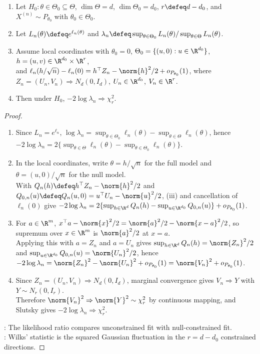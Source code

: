 \begin{theorem} \label{thm:wilks-likelihood-ratio-chi-square} 
\begin{enumerate}[label=(\roman*)]
\setlength{\itemsep}{0pt}
\item Let $H_0:\theta\in\Theta_0\subseteq\Theta$, $\dim\Theta=d$, $\dim\Theta_0=d_0$, $r\defeq d-d_0$, and $X^{(n)}\sim P_{\theta_0}$ with $\theta_0\in\Theta_0$.
\item Let $L_n(\theta)\defeq e^{\ell_n(\theta)}$ and $\lambda_n\defeq\sup_{\theta\in\Theta_0}L_n(\theta)/\sup_{\theta\in\Theta}L_n(\theta)$.
\item Assume local coordinates with $\theta_0=0$, $\Theta_0=\{(u,0):u\in\R^{d_0}\}$, $h=(u,v)\in\R^{d_0}\times\R^r$,\\
and $\ell_n(h/\sqrt n)-\ell_n(0)=h^\top Z_n-\norm{h}^2/2+o_{P_{\theta_0}}(1)$, where $Z_n=(U_n,V_n)\Rightarrow N_d(0,I_d)$, $U_n\in\R^{d_0}$, $V_n\in\R^r$.
\item
Then under $H_0$, $-2\log\lambda_n\Rightarrow\chi_r^2$.
\end{enumerate}
\begin{proof}
\begin{enumerate}[label=(\roman*)]
\setlength{\itemsep}{0pt}
\item Since $L_n=e^{\ell_n}$, $\log\lambda_n=\sup_{\theta\in\Theta_0}\ell_n(\theta)-\sup_{\theta\in\Theta}\ell_n(\theta)$, hence $-2\log\lambda_n=2\{\sup_{\theta\in\Theta}\ell_n(\theta)-\sup_{\theta\in\Theta_0}\ell_n(\theta)\}$.
\item In the local coordinates, write $\theta=h/\sqrt n$ for the full model and $\theta=(u,0)/\sqrt n$ for the null model.\\
With $Q_n(h)\defeq h^\top Z_n-\norm{h}^2/2$ and $Q_{0,n}(u)\defeq Q_n(u,0)=u^\top U_n-\norm{u}^2/2$, (iii) and cancellation of $\ell_n(0)$ give $-2\log\lambda_n=2\{\sup_{h\in\R^d}Q_n(h)-\sup_{u\in\R^{d_0}}Q_{0,n}(u)\}+o_{P_{\theta_0}}(1)$.
\item For $a\in\R^m$, $x^\top a-\norm{x}^2/2=\norm{a}^2/2-\norm{x-a}^2/2$, so supremum over $x\in\R^m$ is $\norm{a}^2/2$ at $x=a$.\\
Applying this with $a=Z_n$ and $a=U_n$ gives $\sup_{h\in\R^d}Q_n(h)=\norm{Z_n}^2/2$\\
and $\sup_{u\in\R^{d_0}}Q_{0,n}(u)=\norm{U_n}^2/2$, hence $-2\log\lambda_n=\norm{Z_n}^2-\norm{U_n}^2+o_{P_{\theta_0}}(1)=\norm{V_n}^2+o_{P_{\theta_0}}(1)$.
\item Since $Z_n=(U_n,V_n)\Rightarrow N_d(0,I_d)$, marginal convergence gives $V_n\Rightarrow Y$ with $Y\sim N_r(0,I_r)$.\\
Therefore $\norm{V_n}^2\Rightarrow\norm{Y}^2\sim\chi_r^2$ by continuous mapping, and Slutsky gives $-2\log\lambda_n\Rightarrow\chi_r^2$.
\end{enumerate}
: The likelihood ratio compares unconstrained fit with null-constrained fit.\\
: Wilks' statistic is the squared Gaussian fluctuation in the $r=d-d_0$ constrained directions.
\end{proof}
\end{theorem}

